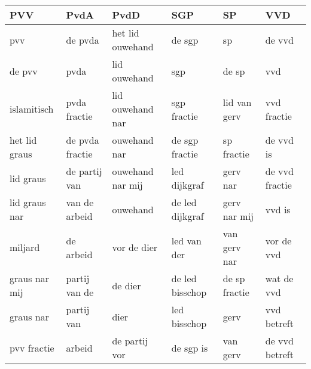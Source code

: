 \begin{tabular}{llllll}
\toprule
           PVV &             PvdA &              PvdD &              SGP &             SP &             VVD \\
\midrule
           pvv &          de pvda &  het lid ouwehand &           de sgp &             sp &          de vvd \\
        de pvv &             pvda &      lid ouwehand &              sgp &          de sp &             vvd \\
   islamitisch &     pvda fractie &  lid ouwehand nar &      sgp fractie &   lid van gerv &     vvd fractie \\
 het lid graus &  de pvda fractie &      ouwehand nar &   de sgp fractie &     sp fractie &       de vvd is \\
     lid graus &    de partij van &  ouwehand nar mij &     led dijkgraf &       gerv nar &  de vvd fractie \\
 lid graus nar &    van de arbeid &          ouwehand &  de led dijkgraf &   gerv nar mij &          vvd is \\
       miljard &        de arbeid &       vor de dier &      led van der &   van gerv nar &      vor de vvd \\
 graus nar mij &    partij van de &           de dier &  de led bisschop &  de sp fractie &      wat de vvd \\
     graus nar &       partij van &              dier &     led bisschop &           gerv &     vvd betreft \\
   pvv fractie &           arbeid &     de partij vor &        de sgp is &       van gerv &  de vvd betreft \\
\bottomrule
\end{tabular}
